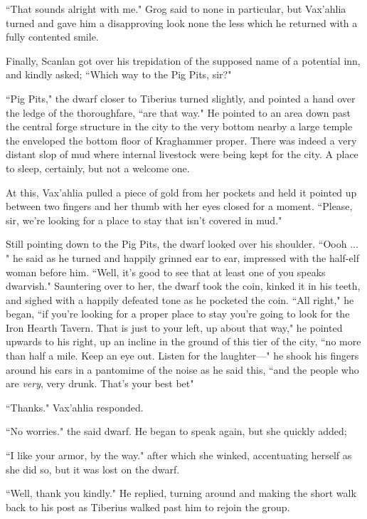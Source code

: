 ``That sounds alright with me." Grog said to none in particular, but Vax'ahlia turned and gave him a disapproving look none the less which he returned with a fully contented smile.

Finally, Scanlan got over his trepidation of the supposed name of a potential inn, and kindly asked; ``Which way to the Pig Pits, sir?"

``Pig Pits," the dwarf closer to Tiberius turned slightly, and pointed a hand over the ledge of the thoroughfare, ``are that way." He pointed to an area down past the central forge structure in the city to the very bottom nearby a large temple the enveloped the bottom floor of Kraghammer proper. There was indeed a very distant slop of mud where internal livestock were being kept for the city. A place to sleep, certainly, but not a welcome one.

At this, Vax'ahlia pulled a piece of gold from her pockets and held it pointed up between two fingers and her thumb with her eyes closed for a moment. ``Please, sir, we're looking for a place to stay that isn't covered in mud."

Still pointing down to the Pig Pits, the dwarf looked over his shoulder. ``Oooh ... " he said as he turned and happily grinned ear to ear, impressed with the half-elf woman before him. ``Well, it's good to see that at least one of you speaks dwarvish." Sauntering over to her, the dwarf took the coin, kinked it in his teeth, and sighed with a happily defeated tone as he pocketed the coin. ``All right," he began, ``if you're looking for a proper place to stay you're going to look for the Iron Hearth Tavern. That is just to your left, up about that way," he pointed upwards to his right, up an incline in the ground of this tier of the city, ``no more than half a mile. Keep an eye out. Listen for the laughter---" he shook his fingers around his ears in a pantomime of the noise as he said this, ``and the people who are \textit{very}, very drunk. That's your best bet"

``Thanks." Vax'ahlia responded.

``No worries." the said dwarf. He began to speak again, but she quickly added;

``I like your armor, by the way." after which she winked, accentuating herself as she did so, but it was lost on the dwarf.

``Well, thank you kindly." He replied, turning around and making the short walk back to his post as Tiberius walked past him to rejoin the group.

